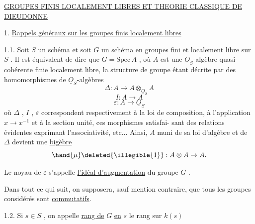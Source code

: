 
\uline{GROUPES FINIS LOCALEMENT LIBRES ET THEORIE CLASSIQUE DE DIEUDONNE}

1. \uline{Rappels généraux sur les groupes finis localement libres}

1.1. Soit $S$ un schéma et soit $G$ un schéma en groupes fini et
localement libre sur $S$ . Il est équivalent de dire que $G = \mathrm{Spec}\, A$ ,
où $A$ est une $\underline{O}_S$-algèbre quasi-cohérente finie localement libre, la
structure de groupe étant décrite par des homomorphismes de $\underline{O}_S$-algèbres
\[ \Delta : A \to A \otimes_{\underline{O}_S} A \]
\[ I : A \to A \]
\[ \varepsilon : A \to \underline{O}_S \]
où $\Delta$ , $I$ , $\varepsilon$ correspondent respectivement à la loi de composition, à
l'application $x \to x^{-1}$ et à la section unité, ces morphismes satisfai-%
sant des relations évidentes exprimant l'associativité, etc... Ainsi, $A$
muni de sa loi d'algèbre et de $\Delta$ devient une \uline{bigèbre}
\margin{$\times$} \margin{$\checkmark$}
\[ \hand{\mu}\deleted{\illegible{1}} : A \otimes A \to A . \]

 Le noyau  de $\varepsilon$ s'appelle \uline{l'idéal d'augmentation} du groupe $G$ .

 Dans tout ce qui suit, on supposera, sauf mention contraire,
que tous les groupes considérés sont \uline{commutatifs}.

1.2. Si $s \in S$ , on appelle \uline{rang de} $G$ \uline{en} $s$ le rang sur $k(s)$

